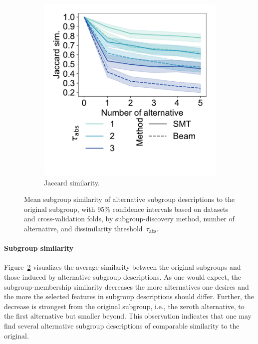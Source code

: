 \documentclass{article}
\theoremstyle{definition}
\begin{document}
\begin{figure}[t]
\begin{subfigure}[t]{0.48\textwidth}
		\includegraphics[width=\textwidth, trim=15 50 15 15, clip]{plots/csd-alternatives-jaccard.pdf}
		\caption{Jaccard similarity.}
		\label{fig:csd:alternatives-jaccard}
	\end{subfigure}
	\caption{
		Mean subgroup similarity of alternative subgroup descriptions to the original subgroup, with 95\% confidence intervals based on datasets and cross-validation folds, by subgroup-discovery method, number of alternative, and dissimilarity threshold~$\tau_{\text{abs}}$.
	}
	\label{fig:csd:alternatives-similarity}
\end{figure}

\paragraph{Subgroup similarity}

Figure~\ref{fig:csd:alternatives-similarity} visualizes the average similarity between the original subgroups and those induced by alternative subgroup descriptions.
As one would expect, the subgroup-membership similarity decreases the more alternatives one desires and the more the selected features in subgroup descriptions should differ.
Further, the decrease is strongest from the original subgroup, i.e., the zeroth alternative, to the first alternative but smaller beyond.
This observation indicates that one may find several alternative subgroup descriptions of comparable similarity to the original.
\end{document}
